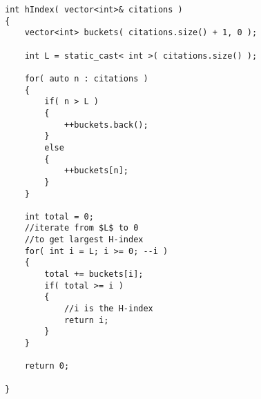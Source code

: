 \setcounter{lstlisting}{0}
\begin{lstlisting}[style=customc, caption={Bucket Sort}]
int hIndex( vector<int>& citations )
{
    vector<int> buckets( citations.size() + 1, 0 );

    int L = static_cast< int >( citations.size() );

    for( auto n : citations )
    {
        if( n > L )
        {
            ++buckets.back();
        }
        else
        {
            ++buckets[n];
        }
    }

    int total = 0;
    //iterate from $L$ to 0
    //to get largest H-index
    for( int i = L; i >= 0; --i )
    {
        total += buckets[i];
        if( total >= i )
        {
            //i is the H-index
            return i;
        }
    }

    return 0;

}
\end{lstlisting}